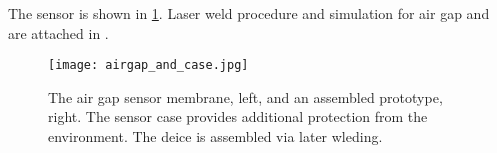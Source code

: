 The sensor is shown in \ref{fig:airgap}.
Laser weld procedure and simulation for air gap and are attached in .

\begin{figure}[ht]
\centering
\texttt{[image: airgap\_and\_case.jpg]}
\caption{
The air gap sensor membrane, left, and an assembled prototype, right.
The sensor case provides additional protection from the environment.
The deice is assembled via later wleding.
}
\label{fig:airgap}
\end{figure}

